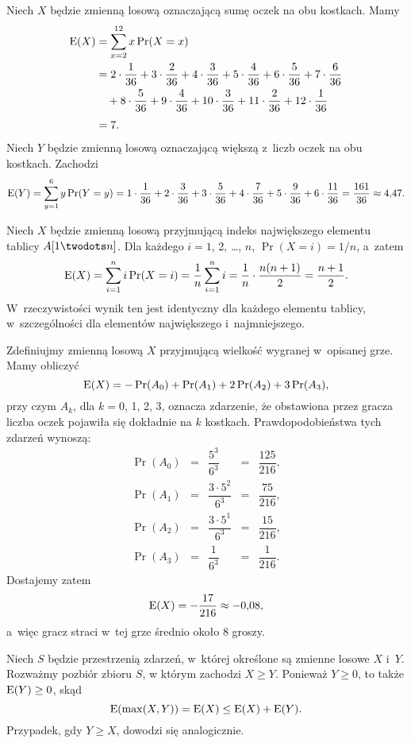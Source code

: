 
\exercise %
Niech $X$ będzie zmienną losową oznaczającą sumę oczek na obu kostkach.
Mamy
\begin{align*}
	\operatorname{E}(X) &= \sum_{x=2}^{12}x\Pr(X=x) \\
	&= 2\cdot\frac{1}{36}+3\cdot\frac{2}{36}+4\cdot\frac{3}{36}+5\cdot\frac{4}{36}+6\cdot\frac{5}{36}+7\cdot\frac{6}{36} \\
	&\quad {}+8\cdot\frac{5}{36}+9\cdot\frac{4}{36}+10\cdot\frac{3}{36}+11\cdot\frac{2}{36}+12\cdot\frac{1}{36} \\[1mm]
	&= 7.
\end{align*}
Niech $Y$ będzie zmienną losową oznaczającą większą z~liczb oczek na obu kostkach.
Zachodzi
\[
	\operatorname{E}(Y) = \sum_{y=1}^{6}y\Pr(Y=y) = 1\cdot\frac{1}{36}+2\cdot\frac{3}{36}+3\cdot\frac{5}{36}+4\cdot\frac{7}{36}+5\cdot\frac{9}{36}+6\cdot\frac{11}{36} = \frac{161}{36} \approx 4{,}47.
\]

\exercise %
Niech $X$ będzie zmienną losową przyjmującą indeks największego elementu tablicy $A[1\twodots n]$.
Dla każdego $i=1$, 2, \dots, $n$, $\Pr(X=i)=1/n$, a~zatem
\[
	\operatorname{E}(X) = \sum_{i=1}^ni\Pr(X=i) = \frac{1}{n}\sum_{i=1}^ni = \frac{1}{n}\cdot\frac{n(n+1)}{2} = \frac{n+1}{2}.
\]
W~rzeczywistości wynik ten jest identyczny dla każdego elementu tablicy, w~szczególności dla elementów największego i~najmniejszego.

\exercise %
Zdefiniujmy zmienną losową $X$ przyjmującą wielkość wygranej w~opisanej grze.
Mamy obliczyć
\[
	\operatorname{E}(X) = -\Pr(A_0)+\Pr(A_1)+2\Pr(A_2)+3\Pr(A_3),
\]
przy czym $A_k$, dla $k=0$, 1, 2, 3, oznacza zdarzenie, że obstawiona przez gracza liczba oczek pojawiła się dokładnie na $k$ kostkach.
Prawdopodobieństwa tych zdarzeń wynoszą:
\[
	\begin{array}{ccccc}
	\Pr(A_0) &=& \dfrac{5^3}{6^3} &=& \dfrac{125}{216}, \\[3mm]
	\Pr(A_1) &=& \dfrac{3\cdot 5^2}{6^3} &=& \dfrac{75}{216}, \\[3mm]
	\Pr(A_2) &=& \dfrac{3\cdot 5^1}{6^3} &=& \dfrac{15}{216}, \\[3mm]
	\Pr(A_3) &=& \dfrac{1}{6^3} &=& \dfrac{1}{216}.
	\end{array}
\]
Dostajemy zatem
\[
	\operatorname{E}(X) = -\dfrac{17}{216} \approx -0{,}08,
\]
a~więc gracz straci w~tej grze średnio około 8 groszy.

\exercise %
Niech $S$ będzie przestrzenią zdarzeń, w~której określone są zmienne losowe $X$ i~$Y$.
Rozważmy pozbiór zbioru $S$, w którym zachodzi $X\ge Y$.
Ponieważ $Y\ge0$, to także $\operatorname{E}(Y)\ge0$, skąd
\[
    \operatorname{E}(\max(X,Y)) = \operatorname{E}(X) \le \operatorname{E}(X)+\operatorname{E}(Y).
\]
Przypadek, gdy $Y\ge X$, dowodzi się analogicznie.

